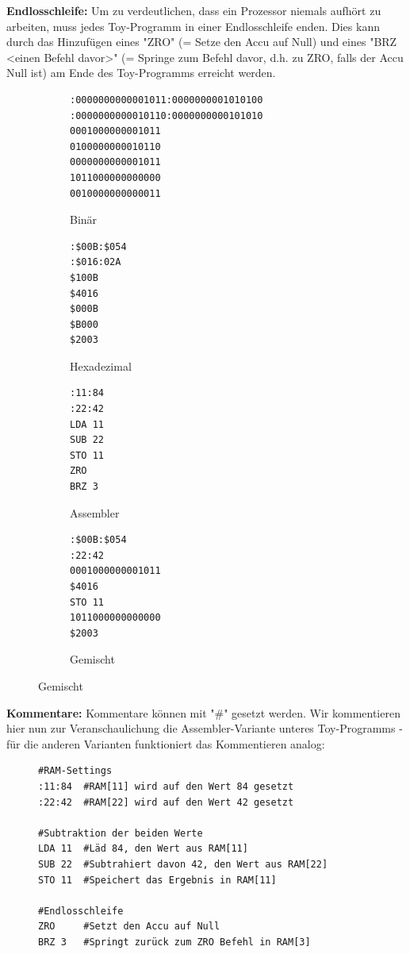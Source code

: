 \documentclass{article}
\begin{document}
\noindent \textbf{Endlosschleife:} Um zu verdeutlichen, dass ein Prozessor
niemals aufhört zu arbeiten, muss jedes Toy-Programm in einer Endlosschleife
enden. Dies kann durch das Hinzufügen eines "ZRO" (= Setze den Accu auf Null)
und eines "BRZ <einen Befehl davor>" (= Springe zum Befehl davor, d.h. zu ZRO,
falls der Accu Null ist) am Ende des Toy-Programms erreicht werden.
\begin{figure}[h!]
    \centering
    \begin{subfigure}[b]{0.45\textwidth}
\begin{lstlisting}
:0000000000001011:0000000001010100
:0000000000010110:0000000000101010
0001000000001011
0100000000010110
0000000000001011
1011000000000000
0010000000000011
\end{lstlisting}
        \caption{Binär}
   \end{subfigure}
   \begin{subfigure}[b]{0.15\textwidth}
\begin{lstlisting}
:$00B:$054
:$016:02A
$100B
$4016
$000B
$B000
$2003
\end{lstlisting}
        \caption{Hexadezimal}
    \end{subfigure}
    \begin{subfigure}[b]{0.15\textwidth}
\begin{lstlisting}
:11:84
:22:42
LDA 11
SUB 22
STO 11
ZRO
BRZ 3
\end{lstlisting}
        \caption{Assembler}
    \end{subfigure}
    \begin{subfigure}[b]{0.2\textwidth}
\begin{lstlisting}
:$00B:$054
:22:42
0001000000001011
$4016
STO 11
1011000000000000
$2003
\end{lstlisting}
        \caption{Gemischt}
\end{subfigure}
\end{figure}

\newpage

\noindent \textbf{Kommentare:}
Kommentare können mit "\#" gesetzt werden. Wir kommentieren hier nun zur
Veranschaulichung die Assembler-Variante unteres Toy-Programms - für die
anderen Varianten funktioniert das Kommentieren analog:
\begin{figure}[h!]
\begin{lstlisting}
#RAM-Settings
:11:84  #RAM[11] wird auf den Wert 84 gesetzt
:22:42  #RAM[22] wird auf den Wert 42 gesetzt

#Subtraktion der beiden Werte
LDA 11  #Läd 84, den Wert aus RAM[11]
SUB 22  #Subtrahiert davon 42, den Wert aus RAM[22]
STO 11  #Speichert das Ergebnis in RAM[11]

#Endlosschleife
ZRO     #Setzt den Accu auf Null
BRZ 3   #Springt zurück zum ZRO Befehl in RAM[3]
\end{lstlisting}
\end{figure}
\end{document}
